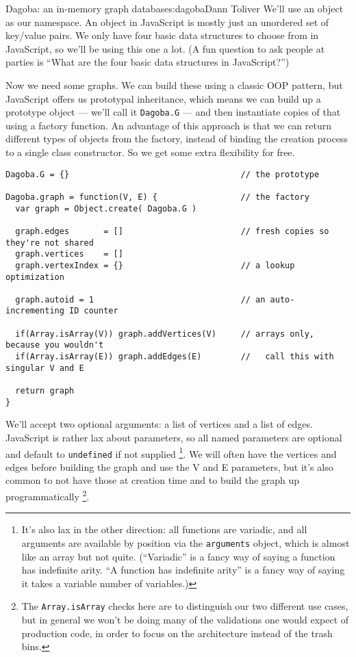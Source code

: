 \begin{aosachapter}{Dagoba: an in-memory graph database}{s:dagoba}{Dann Toliver}
We'll use an object as our namespace. An object in JavaScript is mostly
just an unordered set of key/value pairs. We only have four basic data
structures to choose from in JavaScript, so we'll be using this one a
lot. (A fun question to ask people at parties is ``What are the four
basic data structures in JavaScript?'')

Now we need some graphs. We can build these using a classic OOP pattern,
but JavaScript offers us prototypal inheritance, which means we can
build up a prototype object --- we'll call it \texttt{Dagoba.G} --- and
then instantiate copies of that using a factory function. An advantage
of this approach is that we can return different types of objects from
the factory, instead of binding the creation process to a single class
constructor. So we get some extra flexibility for free.

\begin{verbatim}
Dagoba.G = {}                                   // the prototype

Dagoba.graph = function(V, E) {                 // the factory
  var graph = Object.create( Dagoba.G )

  graph.edges       = []                        // fresh copies so they're not shared
  graph.vertices    = []
  graph.vertexIndex = {}                        // a lookup optimization

  graph.autoid = 1                              // an auto-incrementing ID counter

  if(Array.isArray(V)) graph.addVertices(V)     // arrays only, because you wouldn't
  if(Array.isArray(E)) graph.addEdges(E)        //   call this with singular V and E

  return graph
}
\end{verbatim}

We'll accept two optional arguments: a list of vertices and a list of
edges. JavaScript is rather lax about parameters, so all named
parameters are optional and default to \texttt{undefined} if not
supplied \footnote{It's also lax in the other direction: all functions
  are variadic, and all arguments are available by position via the
  \texttt{arguments} object, which is almost like an array but not
  quite. (``Variadic'' is a fancy way of saying a function has
  indefinite arity. ``A function has indefinite arity'' is a fancy way
  of saying it takes a variable number of variables.)}. We will often
have the vertices and edges before building the graph and use the V and
E parameters, but it's also common to not have those at creation time
and to build the graph up programmatically \footnote{The
  \texttt{Array.isArray} checks here are to distinguish our two
  different use cases, but in general we won't be doing many of the
  validations one would expect of production code, in order to focus on
  the architecture instead of the trash bins.}.


\end{aosachapter}

